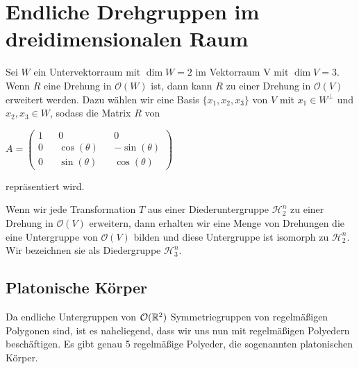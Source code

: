 \section{Endliche Drehgruppen im dreidimensionalen Raum}
\begin{bem}
 Sei $W$ ein Untervektorraum mit $\dim W = 2$ im Vektorraum V mit $\dim V = 3$. Wenn $R$ eine Drehung in $\mathcal{O}(W)$ ist, dann kann $R$ zu einer Drehung in $\mathcal{O}(V)$ erweitert werden. Dazu wählen wir eine Basis $\{x_1,x_2,x_3\}$ von $V$ mit $x_1 \in W^{\perp}$ und $x_2,x_3 \in W$, sodass die Matrix $R$ von \begin{center}
                                                                                                                                                                                                                                                                                                                                 $A=\begin{pmatrix}                                                                                                                                                                                                                                                                                                                                     
   1 && 0 && 0 \\
   0 && \cos(\theta) && -\sin(\theta) \\
   0 && \sin(\theta) && \cos(\theta)
   \end{pmatrix}
$                                                                                                                                                                                                                                                                                                                         \end{center}
repräsentiert wird.
\end{bem}
\begin{bem}
 Wenn wir jede Transformation $T$ aus einer Diederuntergruppe $\mathcal{H}^n_2$ zu einer Drehung in $\mathcal{O}(V)$ erweitern, dann erhalten wir eine Menge von Drehungen die eine Untergruppe von $\mathcal{O}(V)$ bilden und diese Untergruppe ist isomorph zu $\mathcal{H}^n_2$. Wir bezeichnen sie als Diedergruppe $\mathcal{H}^n_3$.
\end{bem}
\subsection{Platonische Körper}
 Da endliche Untergruppen von ${\mathcal{O}(\mathbb{R}^2)}$ Symmetriegruppen von regelmäßigen Polygonen sind, ist es naheliegend, dass wir uns nun mit regelmäßigen Polyedern beschäftigen. Es gibt genau 5 regelmäßige Polyeder, die sogenannten platonischen Körper. 
 

